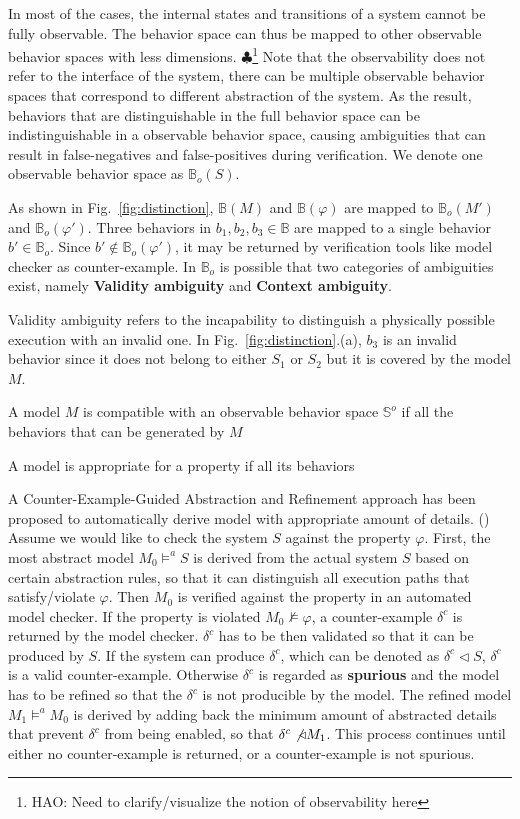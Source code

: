 \documentclass{llncs}
\newcommand{\figref}[1]{Fig.~\ref{fig:#1}}
\newcommand{\Hao}[1]{$\clubsuit$\footnote{HAO: #1}}
\begin{document}
In most of the cases, the internal states and transitions of a system cannot be fully observable. The behavior space can thus be mapped to other observable behavior spaces with less dimensions.
\Hao{Need to clarify/visualize the notion of observability here} 
Note that the observability does not refer to the interface of the system, there can be multiple observable behavior spaces that correspond to different abstraction of the system. As the result, behaviors that are distinguishable in the full behavior space can be indistinguishable in a observable behavior space, causing ambiguities that can result in false-negatives and false-positives during verification. We denote one observable behavior space as $\mathbb{B}_o(S)$. 

As shown in \figref{distinction}, $\mathbb{B}(M)$ and $\mathbb{B}(\varphi)$ are mapped to $\mathbb{B}_o(M')$ and $\mathbb{B}_o(\varphi')$. Three behaviors in $b_1,b_2,b_3\in\mathbb{B}$ are mapped to a single behavior $b'\in\mathbb{B}_o$. Since $b'\not\in\mathbb{B}_o(\varphi')$, it may be returned by verification tools like model checker as counter-example. In $\mathbb{B}_o$ is possible that two categories of ambiguities exist, namely \textbf{Validity ambiguity} and \textbf{Context ambiguity}. %

Validity ambiguity refers to the incapability to distinguish a physically possible execution with an invalid one. In \figref{distinction}.(a), $b_3$ is an invalid behavior since it does not belong to either $S_1$ or $S_2$ but it is covered by the model $M$. 

A model $M$ is compatible with an observable behavior space $\mathbb{S}^o$ if all the behaviors that can be generated by $M$ 

A model is appropriate for a property if all its behaviors  



A Counter-Example-Guided Abstraction and Refinement approach has been proposed to automatically derive model with appropriate amount of details. (\cite{CEGAR}) Assume we would like to check the system $S$ against the property $\varphi$. First, the most abstract model $M_0\models^a S$ is derived from the actual system $S$ based on certain abstraction rules, so that it can distinguish all execution paths that satisfy/violate $\varphi$. Then $M_0$ is verified against the property in an automated model checker. If the property is violated $M_0\not\models\varphi$, a counter-example $\delta^c$ is returned by the model checker. $\delta^c$ has to be then validated so that it can be produced by $S$. If the system can produce $\delta^c$, which can be denoted as $\delta^c\triangleleft S$, $\delta^c$ is a valid counter-example. Otherwise $\delta^c$ is regarded as \textbf{spurious} and the model has to be refined so that the $\delta^c$ is not producible by the model. The refined model $M_1\models^a M_0$ is derived by adding back the minimum amount of abstracted details that prevent $\delta^c$ from being enabled, so that $\delta^c\not\triangleleft M_1$. This process continues until either no counter-example is returned, or a counter-example is not spurious. 
\end{document}
